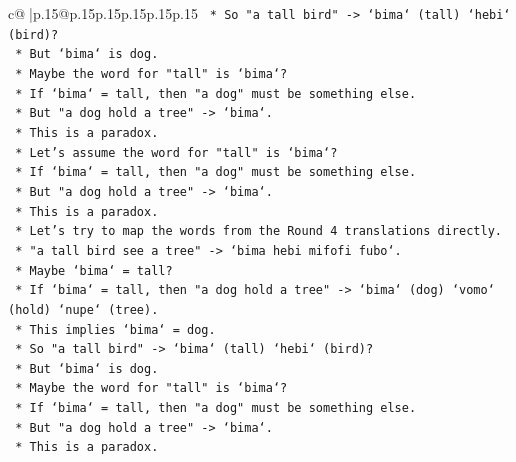 \documentclass{article}
\begin{document}
{\begin{supertabular}{c@{$\;$}|p{.15\linewidth}@{}p{.15\linewidth}p{.15\linewidth}p{.15\linewidth}p{.15\linewidth}p{.15\linewidth}}
{{{\texttt{                            *   So "a tall bird" {-}> `bima` (tall) `hebi` (bird)?} \\
\texttt{                            *   But `bima` is dog.} \\
\texttt{                            *   Maybe the word for "tall" is `bima`?} \\
\texttt{                            *   If `bima` = tall, then "a dog" must be something else.} \\
\texttt{                            *   But "a dog hold a tree" {-}> `bima`.} \\
\texttt{                            *   This is a paradox.} \\
\texttt{                            *   Let's assume the word for "tall" is `bima`?} \\
\texttt{                            *   If `bima` = tall, then "a dog" must be something else.} \\
\texttt{                            *   But "a dog hold a tree" {-}> `bima`.} \\
\texttt{                            *   This is a paradox.} \\
\texttt{                            *   Let's try to map the words from the Round 4 translations directly.} \\
\texttt{                            *   "a tall bird see a tree" {-}> `bima hebi mifofi fubo`.} \\
\texttt{                            *   Maybe `bima` = tall?} \\
\texttt{                            *   If `bima` = tall, then "a dog hold a tree" {-}> `bima` (dog) `vomo` (hold) `nupe` (tree).} \\
\texttt{                            *   This implies `bima` = dog.} \\
\texttt{                            *   So "a tall bird" {-}> `bima` (tall) `hebi` (bird)?} \\
\texttt{                            *   But `bima` is dog.} \\
\texttt{                            *   Maybe the word for "tall" is `bima`?} \\
\texttt{                            *   If `bima` = tall, then "a dog" must be something else.} \\
\texttt{                            *   But "a dog hold a tree" {-}> `bima`.} \\
\texttt{                            *   This is a paradox.} \\
}}}
\end{supertabular}}
\end{document}
